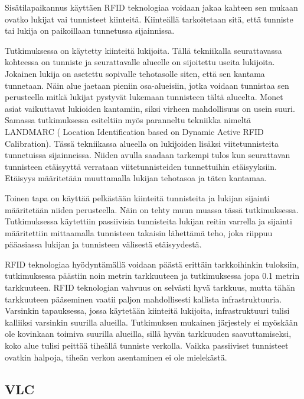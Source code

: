 Sisätilapaikannus käyttäen RFID teknologiaa voidaan jakaa kahteen sen mukaan ovatko lukijat vai tunnisteet kiinteitä. Kiinteällä tarkoitetaan sitä, että tunniste tai lukija on paikoillaan tunnetussa sijainnissa. 

Tutkimuksessa \cite{E} on käytetty kiinteitä lukijoita. Tällä tekniikalla seurattavassa kohteessa on tunniste ja seurattavalle alueelle on sijoitettu useita lukijoita. Jokainen lukija on asetettu sopivalle tehotasolle siten, että sen kantama tunnetaan. Näin alue jaetaan pieniin osa-alueisiin, jotka voidaan tunnistaa sen perusteella mitkä lukijat pystyvät lukemaan tunnisteen tältä alueelta. Monet asiat vaikuttavat lukioiden kantamiin, siksi virheen mahdollisuus on usein suuri.
Samassa tutkimuksessa\cite{E} esiteltiin myös paranneltu tekniikka nimeltä LANDMARC ( Location Identification based on Dynamic Active RFID Calibration). Tässä tekniikassa alueella on lukijoiden lisäksi viitetunnisteita tunnetuissa sijainneissa. Niiden avulla saadaan tarkempi tulos kun seurattavan tunnisteen etäisyyttä verrataan viitetunnisteiden tunnettuihin etäisyyksiin. Etäisyys määritetään muuttamalla lukijan tehotasoa ja täten kantamaa.

Toinen tapa on käyttää pelkästään kiinteitä tunnisteita ja lukijan sijainti määritetään niiden perusteella. Näin on tehty muun muassa tässä tutkimuksessa\cite{F}. Tutkimuksessa käytettiin passiivisia tunnisteita lukijan reitin varrella ja sijainti määritettiin mittaamalla tunnisteen takaisin lähettämä teho, joka riippuu pääasiassa lukijan ja tunnisteen välisestä etäisyydestä\cite{F}.

RFID teknologiaa hyödyntämällä voidaan päästä erittäin tarkkoihinkin tuloksiin, tutkimuksessa \cite{E} päästiin noin metrin tarkkuuteen ja tutkimuksessa \cite{F} jopa 0.1 metrin tarkkuuteen. RFID teknologian vahvuus on selvästi hyvä tarkkuus, mutta tähän tarkkuuteen pääseminen vaatii paljon mahdollisesti kallista infrastruktuuria. Varsinkin tapauksessa\cite{E}, jossa käytetään kiinteitä lukijoita, infrastruktuuri tulisi kalliiksi varsinkin suurilla alueilla. Tutkimuksen\cite{F} mukainen järjestely ei myöskään ole kovinkaan toimiva suurilla alueilla, sillä hyvän tarkkuuden saavuttamiseksi, koko alue tulisi peittää tiheällä tunniste verkolla. Vaikka passiiviset tunnisteet ovatkin halpoja\cite{F}, tiheän verkon asentaminen ei ole mielekästä.

\subsection{VLC}
